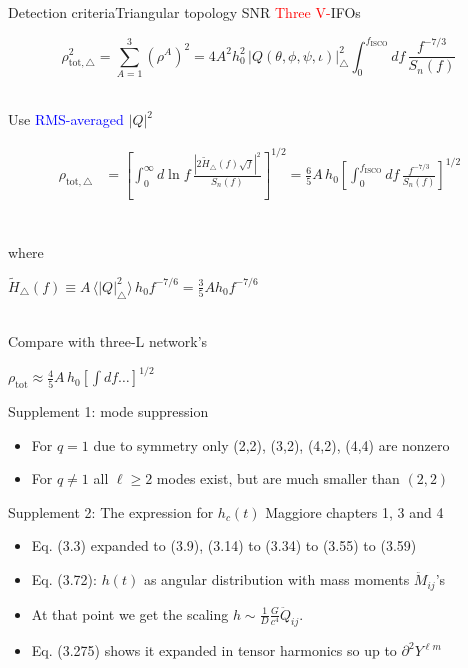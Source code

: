 \documentclass[xcolor=dvipsnames,handout,t]{beamer}
\newcommand{\red}[1]{\textcolor{red}{#1}}
\newcommand{\bl}[1]{\textcolor{blue}{#1}}
\newcommand{\f}{\frac}
\begin{document}
\begin{frame}{Detection criteria}{Triangular topology SNR}
\red{Three V-}IFOs
\begin{footnotesize} 
\[
 \rho^2_{\text{tot},\bigtriangleup} = \sum_{A=1}^3 \left(\rho^A\right)^2  =  4 A^2 h_0^2\,|Q(\theta,\phi,\psi,\iota)|_\bigtriangleup^2 \int_0^{f_\text{ISCO}} d f\, \f{f^{-7/3}}{S_n(f)} \,
\]
\end{footnotesize}
\\
Use \bl{RMS-averaged} $|Q|^2$
\begin{footnotesize}
\begin{align*}
\rho_{\text{tot},\bigtriangleup} &= \left[ \int_0^\infty d\ln f\, \f{|{2\tilde{H}_\bigtriangleup(f)\sqrt{f}}|^2}{S_n(f)}\right]^{1/2} 
=\f{6}{5}A\, h_0 \left[\int_0^{f_\text{ISCO}} d f\, \f{f^{-7/3}}{S_n(f)}\right]^{1/2} \\
\end{align*}
\end{footnotesize}
\\
where \begin{small}$\tilde{H}_\bigtriangleup(f)\equiv A\,  \langle |Q|^2_\bigtriangleup\rangle\, h_0 f^{-7/6}= \f{3}{5} A h_0 f^{-7/6}$ \end{small}\\
\vspace{2mm}
Compare with three-L network's \begin{small}$\rho_\text{tot} \approx \tfrac{4}{5}A\, h_0 \left[ \int df \ldots \right]^{1/2} $ \end{small}
%
%
%
% 
\end{frame}




\begin{frame}{Supplement 1: mode suppression}
\begin{itemize}
 \item For $q=1$ due to symmetry only (2,2), (3,2), (4,2), (4,4) are nonzero 
 \item For $q\ne 1$ all $\ell \ge 2$ modes exist, but are much smaller than $(2,2)$
\end{itemize}
\end{frame}


\begin{frame}{Supplement 2: The expression for $h_c(t)$}
Maggiore chapters 1, 3 and 4
\begin{itemize}
 \item Eq. (3.3) expanded to (3.9), (3.14) to (3.34) to (3.55) to (3.59)
 \item Eq. (3.72): $h(t)$ as angular distribution with mass moments $\ddot{M}_{ij}$'s
 \item At that point we get the scaling $h \sim \tfrac{1}{D}\tfrac{G}{c^4}\ddot{Q}_{ij}$.
 \item Eq. (3.275) shows it expanded in tensor harmonics so up to $\partial^2 Y^{\ell m}$
\end{itemize}
\end{frame}
\end{document}
